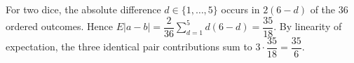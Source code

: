 For two dice, the absolute difference $d\in\{1,\ldots,5\}$ occurs in $2(6-d)$ of the $36$ ordered outcomes. Hence $E|a-b|=\dfrac{2}{36}\sum_{d=1}^5d(6-d)=\dfrac{35}{18}$. By linearity of expectation, the three identical pair contributions sum to $3\cdot\dfrac{35}{18}=\boxed{\dfrac{35}{6}}$.
